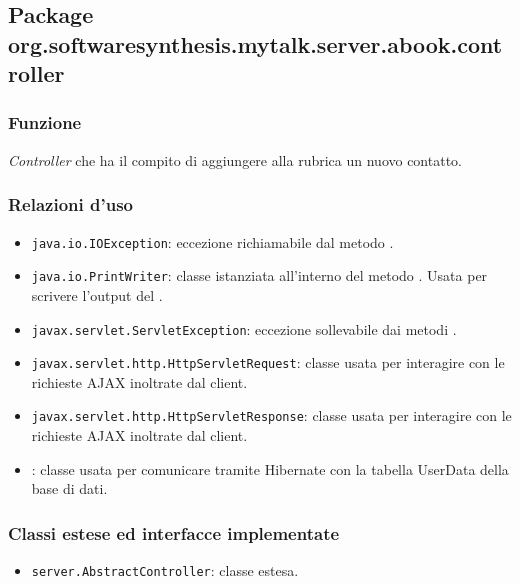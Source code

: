\subsection{Package org.softwaresynthesis.mytalk.server.abook.controller}\label{sec:call}



\subsubsection*{Funzione}
\textit{Controller} che ha il compito di aggiungere alla rubrica un nuovo contatto.

\subsubsection*{Relazioni d'uso}

\begin{itemize}
	\item \texttt{java.io.IOException}: eccezione richiamabile dal metodo .
	\item \texttt{java.io.PrintWriter}: classe istanziata all'interno del metodo . Usata per scrivere l'output del .
	\item \texttt{javax.servlet.ServletException}: eccezione sollevabile dai metodi .
	\item \texttt{javax.servlet.http.HttpServletRequest}: classe usata per interagire con le richieste AJAX inoltrate dal client.
	\item \texttt{javax.servlet.http.HttpServletResponse}: classe usata per interagire con le richieste AJAX inoltrate dal client.
	\item {}: classe usata per comunicare tramite Hibernate con la tabella UserData della base di dati.
\end{itemize}

\subsubsection*{Classi estese ed interfacce implementate}
\begin{itemize}
	\item \texttt{server.AbstractController}: classe estesa.
\end{itemize}

